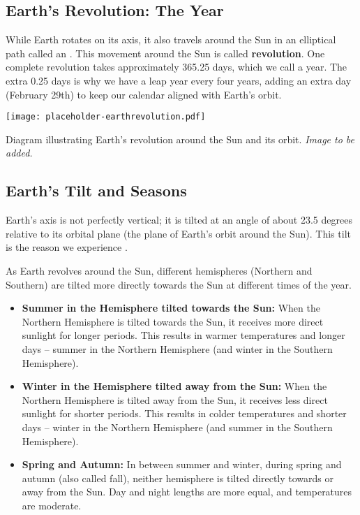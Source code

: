 \subsection{Earth's Revolution: The Year}

While Earth rotates on its axis, it also travels around the Sun in an elliptical path called an . This movement around the Sun is called \textbf{revolution}. One complete revolution takes approximately 365.25 days, which we call a year.  The extra 0.25 days is why we have a leap year every four years, adding an extra day (February 29th) to keep our calendar aligned with Earth's orbit.

\begin{marginfigure}
\texttt{[image: placeholder-earthrevolution.pdf]}
\caption{\label{fig:earthrevolution}Diagram illustrating Earth's revolution around the Sun and its orbit. \textit{Image to be added.}}
\end{marginfigure}


\subsection{Earth's Tilt and Seasons}

Earth's axis is not perfectly vertical; it is tilted at an angle of about 23.5 degrees relative to its orbital plane (the plane of Earth's orbit around the Sun). This tilt is the reason we experience .

As Earth revolves around the Sun, different hemispheres (Northern and Southern) are tilted more directly towards the Sun at different times of the year.

\begin{itemize}
    \item \textbf{Summer in the Hemisphere tilted towards the Sun:} When the Northern Hemisphere is tilted towards the Sun, it receives more direct sunlight for longer periods. This results in warmer temperatures and longer days – summer in the Northern Hemisphere (and winter in the Southern Hemisphere).
    \item \textbf{Winter in the Hemisphere tilted away from the Sun:} When the Northern Hemisphere is tilted away from the Sun, it receives less direct sunlight for shorter periods. This results in colder temperatures and shorter days – winter in the Northern Hemisphere (and summer in the Southern Hemisphere).
    \item \textbf{Spring and Autumn:} In between summer and winter, during spring and autumn (also called fall), neither hemisphere is tilted directly towards or away from the Sun.  Day and night lengths are more equal, and temperatures are moderate.
\end{itemize}

